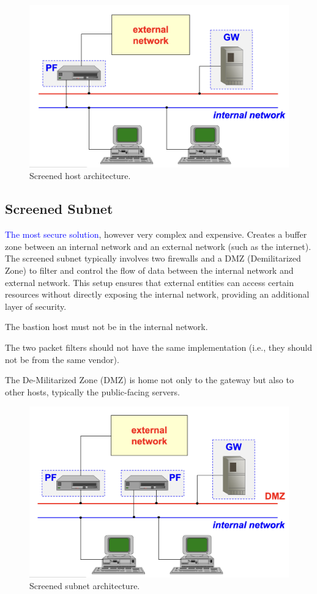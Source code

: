 \begin{figure}[H]
    \centering
    \includegraphics[width=0.5\linewidth]{Images/Firewalling/screened_host.png}
    \caption{Screened host architecture.}
\end{figure}

\subsection{Screened Subnet}
\textcolor{blue}{The most secure solution}, however very complex and expensive. Creates a buffer zone between an internal network and an external network (such as the internet). The screened subnet typically involves two firewalls and a DMZ (Demilitarized Zone) to filter and control the flow of data between the internal network and external network. This setup ensures that external entities can access certain resources without directly exposing the internal network, providing an additional layer of security.

\begin{tcolorbox}[colback=red!10!white, colframe=red!70!black, coltitle=white, title=Beware]
The bastion host must not be in the internal network.

\hfill 

The two packet filters should not have the same implementation (i.e., they should not be from the same vendor).
\end{tcolorbox}

\begin{tcolorbox}[colback=blue!10!white, colframe=blue!50!white, title=DMZ]
    The De-Militarized Zone (DMZ) is home not only to the gateway but also to other hosts, typically the public-facing servers.
\end{tcolorbox}

\begin{figure}[H]
    \centering
    \includegraphics[width=0.5\linewidth]{Images/Firewalling/screened_subnet.png}
    \caption{Screened subnet architecture.}
\end{figure}

